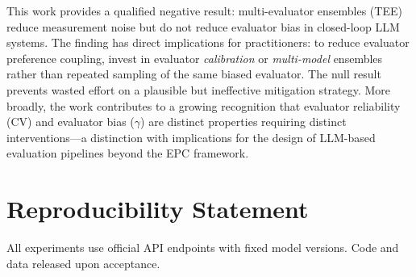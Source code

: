 \documentclass[11pt]{article}
\begin{document}
This work provides a qualified negative result: multi-evaluator ensembles (TEE) reduce measurement noise but do not reduce evaluator bias in closed-loop LLM systems. The finding has direct implications for practitioners: to reduce evaluator preference coupling, invest in evaluator \textit{calibration} or \textit{multi-model} ensembles rather than repeated sampling of the same biased evaluator. The null result prevents wasted effort on a plausible but ineffective mitigation strategy. More broadly, the work contributes to a growing recognition that evaluator reliability (CV) and evaluator bias ($\gamma$) are distinct properties requiring distinct interventions---a distinction with implications for the design of LLM-based evaluation pipelines beyond the EPC framework.

\section*{Reproducibility Statement}
All experiments use official API endpoints with fixed model versions. Code and data released upon acceptance.
\end{document}
